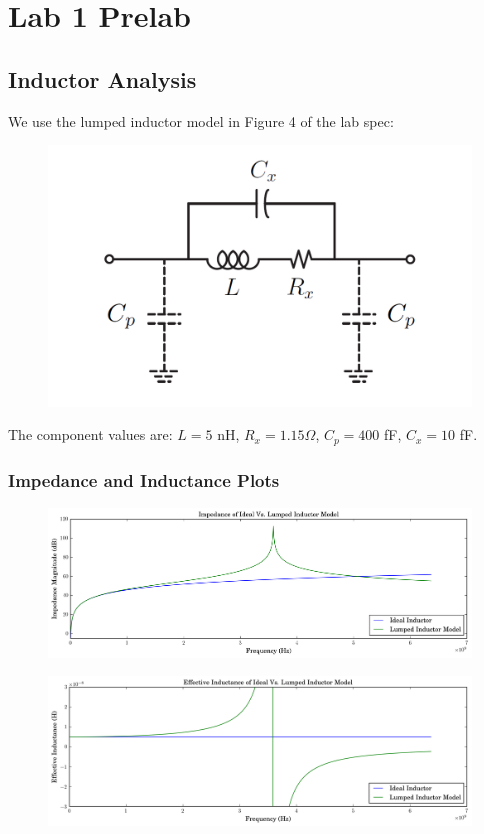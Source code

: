 \documentclass[11pt]{article}
\begin{document}
\section{Lab 1 Prelab}

\subsection{Inductor Analysis}
We use the lumped inductor model in Figure 4 of the lab spec:

\begin{figure}[H]
	\centering \includegraphics[width=\textwidth-8cm]{images/lumped_inductor_model.png}
\end{figure}

The component values are: $L = 5$ nH, $R_{x} = 1.15\Omega$, $C_{p} = 400$ fF, $C_{x} = 10$ fF.

\subsubsection{Impedance and Inductance Plots}

\begin{figure}[H]
	\centering \includegraphics[width=\textwidth]{images/inductor_impedance.png}
\end{figure}
\begin{figure}[H]
	\centering \includegraphics[width=\textwidth]{images/inductor_inductance.png}
\end{figure}
\end{document}
